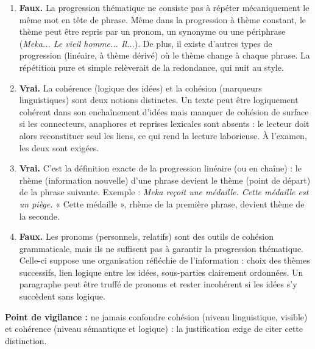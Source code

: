\documentclass[11pt]{article}
\newcommand{\cle}[1]{{\popxbold\color{popdark}#1}}
\begin{document}
\begin{corrige}
\begin{enumerate}
\item \textbf{Faux.} La \cle{progression thématique} ne consiste pas à répéter mécaniquement le même mot en tête de phrase. Même dans la progression à thème constant, le thème peut être repris par un pronom, un synonyme ou une périphrase (\emph{Meka... Le vieil homme... Il...}). De plus, il existe d'autres types de progression (linéaire, à thème dérivé) où le thème change à chaque phrase. La répétition pure et simple relèverait de la redondance, qui nuit au style.
\item \textbf{Vrai.} La \cle{cohérence} (logique des idées) et la \cle{cohésion} (marqueurs linguistiques) sont deux notions distinctes. Un texte peut être logiquement cohérent dans son enchaînement d'idées mais manquer de cohésion de surface si les connecteurs, anaphores et reprises lexicales sont absents : le lecteur doit alors reconstituer seul les liens, ce qui rend la lecture laborieuse. À l'examen, les deux sont exigées.
\item \textbf{Vrai.} C'est la définition exacte de la \cle{progression linéaire} (ou en chaîne) : le \cle{rhème} (information nouvelle) d'une phrase devient le \cle{thème} (point de départ) de la phrase suivante. Exemple : \emph{Meka reçoit une médaille. Cette médaille est un piège.} « Cette médaille », rhème de la première phrase, devient thème de la seconde.
\item \textbf{Faux.} Les pronoms (personnels, relatifs) sont des outils de \cle{cohésion} grammaticale, mais ils ne suffisent pas à garantir la progression thématique. Celle-ci suppose une organisation réfléchie de l'information : choix des thèmes successifs, lien logique entre les idées, sous-parties clairement ordonnées. Un paragraphe peut être truffé de pronoms et rester incohérent si les idées s'y succèdent sans logique.
\end{enumerate}
\textbf{Point de vigilance :} ne jamais confondre cohésion (niveau linguistique, visible) et cohérence (niveau sémantique et logique) : la justification exige de citer cette distinction.
\end{corrige}
\end{document}
